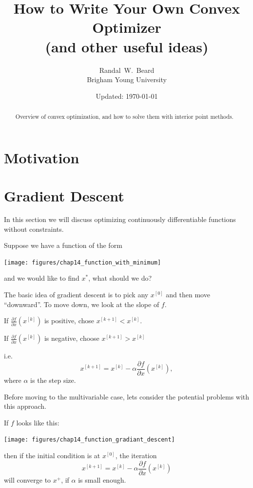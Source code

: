 \documentclass{article}
\title{{\Large \bf How to Write Your Own Convex Optimizer}\\
(and other useful ideas)}
\date{Updated: \today}
\author{Randal~W.~Beard \\ Brigham Young University}
\begin{document}
\maketitle

\begin{abstract}

Overview of convex optimization, and how to solve them with interior point methods.  
\end{abstract}

\section{Motivation}

\section{Gradient Descent}


	In this section we will discuss optimizing continuously differentiable functions without constraints.

	Suppose we have a function of the form
	\begin{center}
		\texttt{[image: figures/chap14\_function\_with\_minimum]}
	\end{center}
	and we would like to find $x^{\ast}$, what should we do?


	The basic idea of gradient descent is to pick any $x^{[0]}$ and then move ``downward''.  To move down, we look at the slope of $f$.
	
	If $\frac{\partial f}{\partial x}(x^{[k]})$ is positive, chose $x^{[k+1]} < x^{[k]}$.
	
	If $\frac{\partial f}{\partial x}(x^{[k]})$ is negative, choose $x^{[k+1]} > x^{[k]}$
	
	i.e.
	\[ 
		x^{[k+1]} = x^{[k]} - \alpha \frac{\partial f}{\partial x}(x^{[k]}),
	\]
	where $\alpha$ is the step size.	

	Before moving to the multivariable case, lets consider the potential problems with this approach.		
	
	
	\par{}
	If $f$ looks like this:
	\begin{center}
		\texttt{[image: figures/chap14\_function\_gradiant\_descent]}
	\end{center}
	then if the initial condition is at $x^{[0]}$, the iteration 
	\[
		x^{[k+1]} = x^{[k]} - \alpha \frac{\partial f}{\partial x}(x^{[k]})
	\] 
	will converge to $x^+$, if $\alpha$ is small enough.
\end{document}
